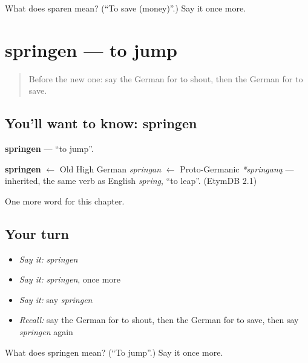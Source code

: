 \begin{tcolorbox}[breakable,colback=teal!4,colframe=teal!35!black,title={Before you move on}]
What does sparen mean? (\textquotedblleft{}To save (money)\textquotedblright{}.) Say it once more.
\end{tcolorbox}
\section[springen]{springen — to jump}

\label{lesson:GE-C150-springen}



\begin{quote}
Before the new one: say the German for to shout, then the German for to save.
\end{quote}

\subsection*{You'll want to know: springen}
\textbf{springen} — \textquotedblleft{}to jump\textquotedblright{}.

\begin{cousinweb}
\textbf{springen} $\leftarrow$ Old High German \emph{springan} $\leftarrow$ Proto-Germanic \emph{*springaną} — inherited, the same verb as English \emph{spring}, \textquotedblleft{}to leap\textquotedblright{}. (EtymDB 2.1)
\end{cousinweb}

\begin{grammarlens}[title={What you've built}]
One more word for this chapter.
\end{grammarlens}

\subsection*{Your turn}
\begin{itemize}
\raggedright
  \item \emph{Say it:} \emph{springen}
  \item \emph{Say it:} \emph{springen}, once more
  \item \emph{Say it:} say \emph{springen}
  \item \emph{Recall:} say the German for to shout, then the German for to save, then say \emph{springen} again
\end{itemize}

\begin{tcolorbox}[breakable,colback=teal!4,colframe=teal!35!black,title={Before you move on}]
What does springen mean? (\textquotedblleft{}To jump\textquotedblright{}.) Say it once more.
\end{tcolorbox}

